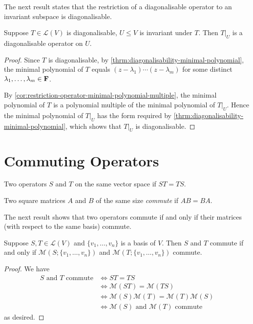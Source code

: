 The next result states that the restriction of a diagonalisable operator to an invariant subspace is diagonalisable.

\begin{corollary}\label{cor:restriction-diagonalisable-operator-invariant-subspace}
Suppose $T\in\mathcal{L}(V)$ is diagonalisable, $U\le V$ is invariant under $T$. Then $T|_U$ is a diagonalisable operator on $U$.
\end{corollary}

\begin{proof}
Since $T$ is diagonalisable, by \ref{thrm:diagonalisability-minimal-polynomial}, the minimal polynomial of $T$ equals $(z-\lambda_1)\cdots(z-\lambda_m)$ for some distinct $\lambda_1,\dots,\lambda_m\in\mathbf F$.

By \ref{cor:restriction-operator-minimal-polynomial-multiple}, the minimal polynomial of $T$ is a polynomial multiple of the minimal polynomial of $T|_U$. Hence the minimal polynomial of $T|_U$ has the form required by \ref{thrm:diagonalisability-minimal-polynomial}, which shows that $T|_U$ is diagonalisable.
\end{proof}
\pagebreak

\section{Commuting Operators}
\begin{definition}[Commute]
Two operators $S$ and $T$ on the same vector space  if $ST=TS$.

Two square matrices $A$ and $B$ of the same size \emph{commute} if $AB=BA$.
\end{definition}

The next result shows that two operators commute if and only if their matrices (with respect to the same basis) commute.

\begin{lemma}\label{lemma:operators-commute-matrices-commute}
Suppose $S,T\in\mathcal{L}(V)$ and $\{v_1,\dots,v_n\}$ is a basis of $V$. Then $S$ and $T$ commute if and only if $\mathcal{M}(S;\{v_1,\dots,v_n\})$ and $\mathcal{M}(T;\{v_1,\dots,v_n\})$ commute.
\end{lemma}

\begin{proof}
We have
\begin{align*}
\text{$S$ and $T$ commute}
&\iff ST=TS\\
&\iff\mathcal{M}(ST)=\mathcal{M}(TS)\\
&\iff\mathcal{M}(S)\mathcal{M}(T)=\mathcal{M}(T)\mathcal{M}(S)\\
&\iff\text{$\mathcal{M}(S)$ and $\mathcal{M}(T)$ commute}
\end{align*}
as desired.
\end{proof}

